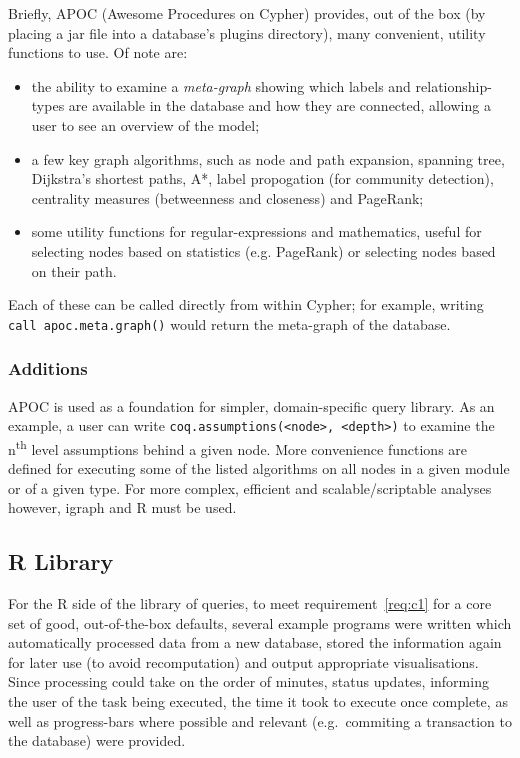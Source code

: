 Briefly, APOC (Awesome Procedures on Cypher) provides, out of the box (by
placing a jar file into a database's plugins directory), many convenient,
utility functions to use. Of note are:

\begin{itemize}

  \item the ability to examine a \emph{meta-graph} showing which labels and
    relationship-types are available in the database and how they are connected, 
    allowing a user to see an overview of the model;

  \item a few key graph algorithms, such as node and path expansion, spanning
    tree, Dijkstra's shortest paths, A*, label propogation (for community
    detection), centrality measures (betweenness and closeness) and PageRank;

  \item some utility functions for regular-expressions and mathematics, useful
    for selecting nodes based on statistics (e.g. PageRank) or selecting nodes
    based on their path.

\end{itemize}

Each of these can be called directly from within Cypher; for example, writing
\texttt{call apoc.meta.graph()} would return the meta-graph of the database.

\subsubsection{Additions}

APOC is used as a foundation for simpler, domain-specific query library.  As an
example, a user can write \texttt{coq.assumptions(<node>, <depth>)} to examine
the n\textsuperscript{th} level assumptions behind a given node. More
convenience functions are defined for executing some of the listed algorithms on
all nodes in a given module or of a given type. For more complex, efficient and
scalable/scriptable analyses however, igraph and R must be used.

\subsection{R Library}

For the R side of the library of queries, to meet requirement~\ref{req:c1} for
a core set of good, out-of-the-box defaults, several example programs were
written which automatically processed data from a new database, stored the
information again for later use (to avoid recomputation) and output appropriate
visualisations. Since processing could take on the order of minutes, status
updates, informing the user of the task being executed, the time it took to
execute once complete, as well as progress-bars where possible and relevant
(e.g.\ commiting a transaction to the database) were provided.


